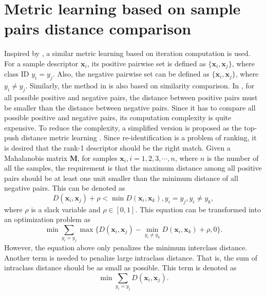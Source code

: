  \section{Metric learning based on sample pairs distance comparison}
 Inspired by \cite{TDL}, a similar metric learning based on iteration computation is used. For a  sample descriptor $\bm{x}_i$,  its positive pairwise set is defined as $\{\bm{x}_i,\bm{x}_j\}$, where class ID $y_i = y_j$. Also, the negative pairwise set can be defined as $\{\bm{x}_i,\bm{x}_j\}$, where $y_i \ne y_j$. Similarly, the method in \cite{PRDC} is also based on similarity comparison. In \cite{PRDC}, for all possible positive and negative pairs, the distance between positive pairs must be smaller than the distance between negative pairs. Since it has to compare all possible positive and negative pairs, its computation complexity is quite expensive. To reduce the complexity, a simplified version is proposed as the top-push distance metric learning \cite{TDL}.  Since re-identification is a problem of ranking, it is desired that the rank-1 descriptor should be the right match. Given a Mahalanobis matrix $\bm{M}$, for samples $\bm{x}_i, i = 1,2,3,\cdots,n$, where $n$ is the number of all the samples, the requirement is that the maximum distance among all positive pairs should be at least one unit smaller than the minimum distance of all negative pairs. This can be denoted as 
 \begin{equation}
 D(\bm{x}_i,\bm{x}_j) + \rho < \min D(\bm{x}_i,\bm{x}_k), y_i = y_j, y_i\ne y_k,
 \end{equation}
 where $\rho$ is a slack variable and $\rho \in [0,1]$. This equation can be transformed into an optimization problem as
 \begin{equation}
 \label{term1}
 \min \sum_{y_i = y_j} \max \{D(\bm{x}_i,\bm{x}_j) -  \min_{ y_i\ne y_k} D(\bm{x}_i,\bm{x}_k)  + \rho , 0\}.
 \end{equation}
However, the equation above only penalizes the minimum interclass distance. Another term is needed to penalize large intraclass distance. That is, the sum of intraclass distance should be as small as possible. This term is denoted as 
 \begin{equation} \label{term2}
 \min \sum_{y_i = y_j} D(\bm{x}_i,\bm{x}_j).
 \end{equation}

